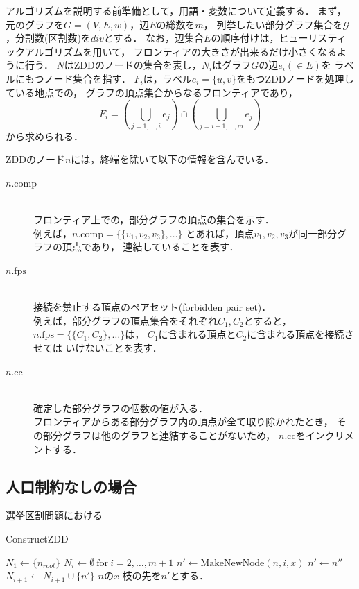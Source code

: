 アルゴリズムを説明する前準備として，用語・変数について定義する．
まず，元のグラフを$G=(V,E,w)$，辺$E$の総数を$m$，
列挙したい部分グラフ集合を$\mathcal{G}$，分割数(区割数)を$div$とする．
なお，辺集合$E$の順序付けは，ヒューリスティックアルゴリズムを用いて，
フロンティアの大きさが出来るだけ小さくなるように行う．
$N$はZDDのノードの集合を表し，$N_i$はグラフ$G$の辺$e_i (\in E)$を
ラベルにもつノード集合を指す．
$F_i$は，ラベル$e_i=\{u,v\}$をもつZDDノードを処理している地点での，
グラフの頂点集合からなるフロンティアであり，
$$ F_i=(\bigcup_{j=1,\ldots ,i}e_j)\cap (\bigcup_{j=i+1, \ldots, m} e_j) $$
から求められる．

ZDDのノード$n$には，終端を除いて以下の情報を含んでいる．

\begin{description}
  \item[$n.\mathrm{comp}$]\mbox{}\\
    フロンティア上での，部分グラフの頂点の集合を示す．\\
    例えば，$n.\mathrm{comp}=\{\{v_1,v_2,v_3\},\ldots\}$
    とあれば，頂点$v_1,v_2,v_3$が同一部分グラフの頂点であり，
    連結していることを表す．
  \item[$n.\mathrm{fps}$ ]\mbox{}\\
    接続を禁止する頂点のペアセット(forbidden pair set)．\\
    例えば，部分グラフの頂点集合をそれぞれ$C_1,C_2$とすると，
    $n.\mathrm{fps}=\{\{C_1,C_2\},\ldots\}$は，
    $C_1$に含まれる頂点と$C_2$に含まれる頂点を接続させては
    いけないことを表す．
  \item[$n.\mathrm{cc}$]\mbox{}\\
    確定した部分グラフの個数の値が入る．\\
    フロンティアからある部分グラフ内の頂点が全て取り除かれたとき，
    その部分グラフは他のグラフと連結することがないため，
    $n.\mathrm{cc}$をインクリメントする．
\end{description}

\subsection{人口制約なしの場合}

選挙区割問題における

\begin{algorithm}
  \caption{ConstructZDD}
  \label{construct_zdd}
  \begin{algorithmic}[1]
    \State $N_1 \gets \{n_{root}\}$
    \State $N_i \gets \emptyset~\mathrm{for}~i=2, \ldots ,m+1$
          \State $n' \gets \mathrm{MakeNewNode}(n,i,x)$
              \State $n' \gets n''$
            \Else
              \State $N_{i+1} \gets N_{i+1} \cup \{n'\}$
            \EndIf
          \EndIf
          \State $n$の$x$-枝の先を$n'$とする．
        \EndFor
      \EndFor
    \EndFor
  \end{algorithmic}
\end{algorithm}

